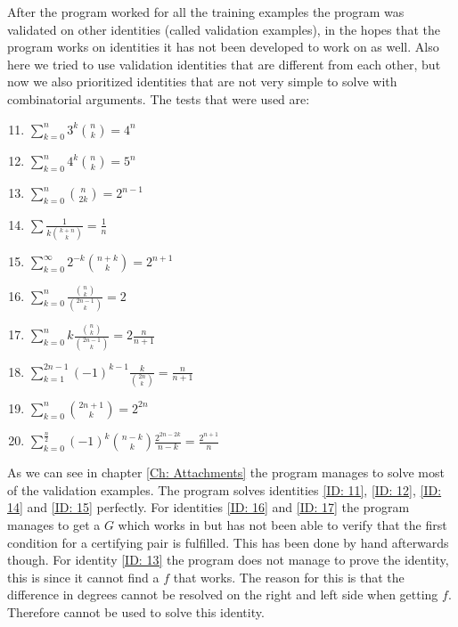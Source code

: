 After the program worked for all the training examples the program was validated on other identities (called validation examples), in the hopes that the program works on identities it has not been developed to work on as well. Also here we tried to use validation identities that are different from each other, but now we also prioritized identities that are not very simple to solve with combinatorial arguments. The tests that were used are:
\begin{enumerate}
  \setcounter{enumi}{10}
  \item $\sum_{k=0}^n 3^k\binom{n}{k} = 4^n$ \label{ID: 11}
  \item $\sum_{k=0}^n 4^k\binom{n}{k} = 5^n$ \label{ID: 12}
  \item $\sum_{k=0}^n \binom{n}{2k} = 2^{n-1}$ \label{ID: 13}
  \item $\sum \frac{1}{k\binom{k+n}{k}} = \frac{1}{n}$ \label{ID: 14}
  \item $\sum_{k=0}^\infty 2^{-k}\binom{n+k}{k} = 2^{n+1}$ \label{ID: 15}
  \item $\sum_{k=0}^n \frac{\binom{n}{k}}{\binom{2n-1}{k}} = 2$ \label{ID: 16}
  \item $\sum_{k=0}^n k\frac{\binom{n}{k}}{\binom{2n-1}{k}} = 2\frac{n}{n+1}$ \label{ID: 17}
  \item $\sum_{k=1}^{2n-1} (-1)^{k-1}\frac{k}{\binom{2n}{k}} = \frac{n}{n+1}$ \label{ID: 18}
  \item $\sum_{k=0}^n \binom{2n+1}{k} = 2^{2n}$ \label{ID: 19}
  \item $\sum_{k=0}^{\frac{n}{2}} (-1)^k\binom{n-k}{k}\frac{2^{2n-2k}}{n-k} = \frac{2^{n+1}}{n}$ \label{ID: 20}
\end{enumerate}
As we can see in chapter \ref{Ch: Attachments} the program manages to solve most of the validation examples. The program solves identities \ref{ID: 11}, \ref{ID: 12}, \ref{ID: 14} and \ref{ID: 15} perfectly. For identities \ref{ID: 16} and \ref{ID: 17} the program manages to get a $G$ which works in \WZ but has not been able to verify that the first condition for a certifying pair is fulfilled. This has been done by hand afterwards though. For identity \ref{ID: 13} the program does not manage to prove the identity, this is since it cannot find a $f$ that works. The reason for this is that the difference in degrees cannot be resolved on the right and left side when getting $f$. Therefore \WZ cannot be used to solve this identity.
